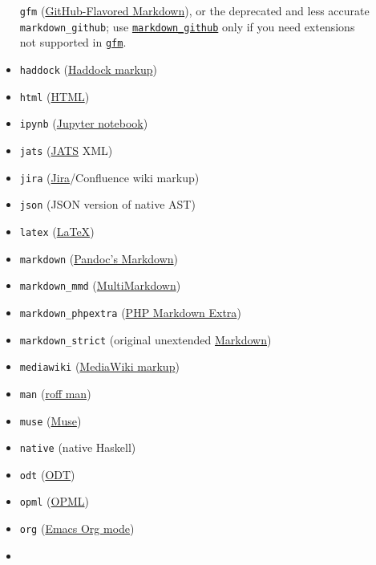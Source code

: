 \documentclass[
]{article}
\begin{document}
\begin{description}
\begin{itemize}
  \texttt{gfm}
  (\href{https://help.github.com/articles/github-flavored-markdown/}{GitHub-Flavored
  Markdown}), or the deprecated and less accurate
  \texttt{markdown\_github}; use
  \hyperref[markdown-variants]{\texttt{markdown\_github}} only if you
  need extensions not supported in
  \hyperref[markdown-variants]{\texttt{gfm}}.
\item
  \texttt{haddock}
  (\href{https://www.haskell.org/haddock/doc/html/ch03s08.html}{Haddock
  markup})
\item
  \texttt{html} (\href{https://www.w3.org/html/}{HTML})
\item
  \texttt{ipynb}
  (\href{https://nbformat.readthedocs.io/en/latest/}{Jupyter notebook})
\item
  \texttt{jats} (\href{https://jats.nlm.nih.gov}{JATS} XML)
\item
  \texttt{jira}
  (\href{https://jira.atlassian.com/secure/WikiRendererHelpAction.jspa?section=all}{Jira}/Confluence
  wiki markup)
\item
  \texttt{json} (JSON version of native AST)
\item
  \texttt{latex} (\href{https://www.latex-project.org/}{LaTeX})
\item
  \texttt{markdown} (\hyperref[pandocs-markdown]{Pandoc's Markdown})
\item
  \texttt{markdown\_mmd}
  (\href{https://fletcherpenney.net/multimarkdown/}{MultiMarkdown})
\item
  \texttt{markdown\_phpextra}
  (\href{https://michelf.ca/projects/php-markdown/extra/}{PHP Markdown
  Extra})
\item
  \texttt{markdown\_strict} (original unextended
  \href{https://daringfireball.net/projects/markdown/}{Markdown})
\item
  \texttt{mediawiki}
  (\href{https://www.mediawiki.org/wiki/Help:Formatting}{MediaWiki
  markup})
\item
  \texttt{man} (\href{https://man.cx/groff_man(7)}{roff man})
\item
  \texttt{muse} (\href{https://amusewiki.org/library/manual}{Muse})
\item
  \texttt{native} (native Haskell)
\item
  \texttt{odt} (\href{https://en.wikipedia.org/wiki/OpenDocument}{ODT})
\item
  \texttt{opml} (\href{http://dev.opml.org/spec2.html}{OPML})
\item
  \texttt{org} (\href{https://orgmode.org}{Emacs Org mode})
\item

\end{itemize}
\end{description}
\end{document}
